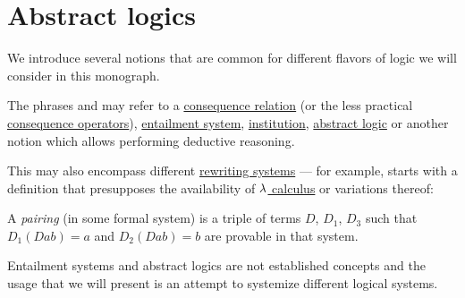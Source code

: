 \section{Abstract logics}\label{sec:abstract_logics}

We introduce several notions that are common for different flavors of logic we will consider in this monograph.

\begin{concept}\label{con:logical_system}
  The phrases  and  may refer to a \hyperref[def:consequence_relation]{consequence relation} (or the less practical \hyperref[def:consequence_operator]{consequence operators}), \hyperref[def:entailment_system]{entailment system}, \hyperref[def:institution]{institution}, \hyperref[def:abstract_logic]{abstract logic} or another notion which allows performing deductive reasoning.

  This may also encompass different \hyperref[def:rewriting_system]{rewriting systems} --- for example, \cite{Barendregt1974SurjectivePairing} starts with a definition that presupposes the availability of \hyperref[ch:lambda_calculus]{\( {\mathrm \lambda} \) calculus} or variations thereof:
  \begin{displayquote}
    A \textit{pairing} (in some formal system) is a triple of terms \( D \), \( D_1 \), \( D_3 \) such that \( D_1(Dab) = a \) and \( D_2(Dab) = b \) are provable in that system.
  \end{displayquote}

  Entailment systems and abstract logics are not established concepts and the usage that we will present is an attempt to systemize different logical systems.
\end{concept}

